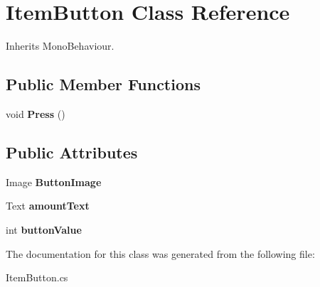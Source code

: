 \hypertarget{class_item_button}{}\section{Item\+Button Class Reference}
\label{class_item_button}


Inherits Mono\+Behaviour.

\subsection*{Public Member Functions}
\begin{DoxyCompactItemize}
\item 
\mbox{\label{class_item_button_a617d6ecf8f5e98cefcac19bdaa4fe679}} 
void {\bfseries Press} ()
\end{DoxyCompactItemize}
\subsection*{Public Attributes}
\begin{DoxyCompactItemize}
\item 
\mbox{\label{class_item_button_ad59005535a4d359a5a1b5cd75af1ea2d}} 
Image {\bfseries Button\+Image}
\item 
\mbox{\label{class_item_button_a73bf40887f6adbc0dfd51ead1a53f0b3}} 
Text {\bfseries amount\+Text}
\item 
\mbox{\label{class_item_button_a201381e2c780babc9ee777eea8513acc}} 
int {\bfseries button\+Value}
\end{DoxyCompactItemize}


The documentation for this class was generated from the following file\+:\begin{DoxyCompactItemize}
\item 
Item\+Button.\+cs\end{DoxyCompactItemize}
